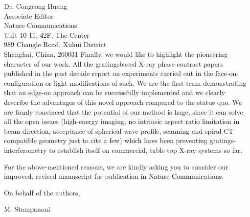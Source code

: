 \documentclass[a4paper,english]{scrlttr2}
\begin{document}
\begin{letter}{Dr. Congcong Huang\\

Associate Editor\\
Nature Communications \\

Unit 10-11, 42F, The Center\\
989 Changle Road, Xuhui District\\
Shanghai, China, 200031}
Finally, we would like to highlight the pioneering character of our work. All the gratingsbased
X-ray phase contrast papers published in the past decade report on experiments
carried out in the face-on-configuration or light modifications of such. We are the first
team demonstrating that an edge-on approach can be successfully implemented and we
clearly describe the advantages of this novel approach compared to the status quo. We are
firmly convinced that the potential of our method is huge, since it can solve all the open
issues (high-energy imaging, no intrinsic aspect ratio limitation in beam-direction,
acceptance of spherical wave profile, scanning and spiral-CT compatible geometry just to
cite a few) which have been preventing gratings-interferometry to establish itself on
commercial, table-top X-ray systems so far.

For the above-mentioned reasons, we are kindly asking you to consider our improved,
revised manuscript for publication in Nature Communications.

\closing{On behalf of the authors,}

M. Stampanoni
\end{letter}
\end{document}
